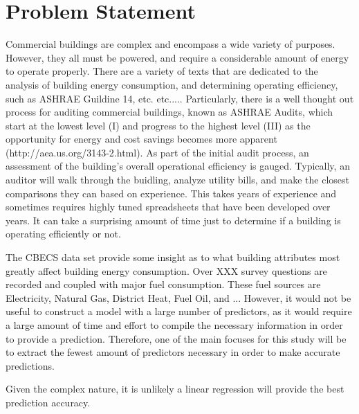 {\section*{Problem Statement}}

Commercial buildings are complex and encompass a wide variety of purposes. However, they all must be powered, and require a considerable amount of energy to operate properly.  There are a variety of texts that are dedicated to the analysis of building energy consumption, and determining operating efficiency, such as ASHRAE Guildine 14, etc. etc.....  Particularly, there is a well thought out process for auditing commercial buildings, known as ASHRAE Audits, which start at the lowest level (I) and progress to the highest level (III) as the opportunity for energy and cost savings becomes more apparent (http://aea.us.org/3143-2.html).  As part of the initial audit process, an assessment of the building's overall operational efficiency is gauged.  Typically, an auditor will walk through the buidling, analyze utility bills, and make the closest comparisons they can based on experience.  This takes years of experience and sometimes requires highly tuned spreadsheets that have been developed over years.  It can take a surprising amount of time just to determine if a building is operating efficiently or not.

The CBECS data set provide some insight as to what building attributes most greatly affect building energy consumption.  Over XXX survey questions are recorded and coupled with major fuel consumption.  These fuel sources are Electricity, Natural Gas, District Heat, Fuel Oil, and ...  However, it would not be useful to construct a model with a large number of predictors, as it would require a large amount of time and effort to compile the necessary information in order to provide a prediction.  Therefore, one of the main focuses for this study will be to extract the fewest amount of predictors necessary in order to make accurate predictions.  

Given the complex nature, it is unlikely a linear regression will provide the best prediction accuracy. 